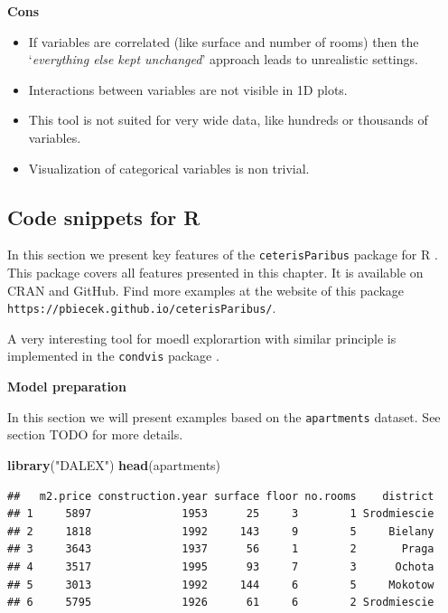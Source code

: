 \documentclass[]{krantz}
\newenvironment{Shaded}{\begin{snugshade}}{\end{snugshade}}
\newcommand{\KeywordTok}[1]{\textcolor[rgb]{0.13,0.29,0.53}{\textbf{#1}}}
\newcommand{\NormalTok}[1]{#1}
\newcommand{\StringTok}[1]{\textcolor[rgb]{0.31,0.60,0.02}{#1}}
\providecommand{\tightlist}{%
  \setlength{\itemsep}{0pt}\setlength{\parskip}{0pt}}
\theoremstyle{definition}
\theoremstyle{definition}
\theoremstyle{definition}
\theoremstyle{remark}
\begin{document}
\textbf{Cons}

\begin{itemize}
\tightlist
\item
  If variables are correlated (like surface and number of rooms) then
  the `\emph{everything else kept unchanged}' approach leads to
  unrealistic settings.
\item
  Interactions between variables are not visible in 1D plots.
\item
  This tool is not suited for very wide data, like hundreds or thousands
  of variables.
\item
  Visualization of categorical variables is non trivial.
\end{itemize}

\hypertarget{code-snippets-for-r-4}{%
\subsection{Code snippets for R}\label{code-snippets-for-r-4}}

In this section we present key features of the \texttt{ceterisParibus}
package for R \citep{R-ceterisParibus}. This package covers all features
presented in this chapter. It is available on CRAN and GitHub. Find more
examples at the website of this package
\texttt{https://pbiecek.github.io/ceterisParibus/}.

A very interesting tool for moedl explorartion with similar principle is
implemented in the \texttt{condvis} package \citep{JSSv081i05}.

\textbf{Model preparation}

In this section we will present examples based on the
\texttt{apartments} dataset. See section TODO for more details.

\begin{Shaded}
\begin{Highlighting}[]
\KeywordTok{library}\NormalTok{(}\StringTok{"DALEX"}\NormalTok{)}
\KeywordTok{head}\NormalTok{(apartments)}
\end{Highlighting}
\end{Shaded}

\begin{verbatim}
##   m2.price construction.year surface floor no.rooms    district
## 1     5897              1953      25     3        1 Srodmiescie
## 2     1818              1992     143     9        5     Bielany
## 3     3643              1937      56     1        2       Praga
## 4     3517              1995      93     7        3      Ochota
## 5     3013              1992     144     6        5     Mokotow
## 6     5795              1926      61     6        2 Srodmiescie
\end{verbatim}
\end{document}
